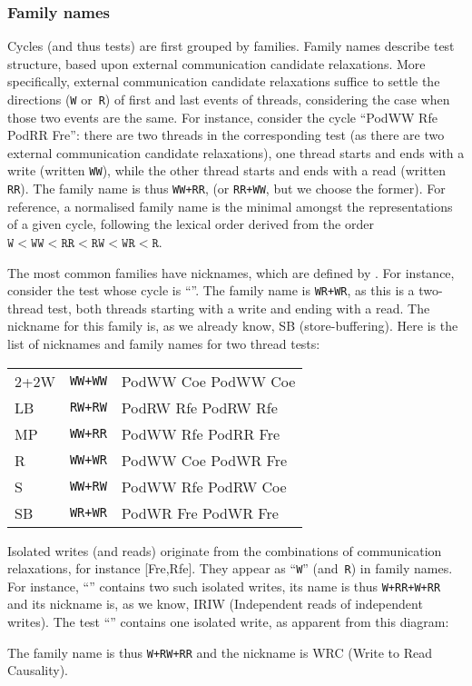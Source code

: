 \subsubsection{Family names}
Cycles (and thus tests) are first grouped by families.
Family names describe test structure,
based upon external communication candidate relaxations.
More specifically, external communication candidate relaxations
suffice to settle the directions (\texttt{W} or~\texttt{R}) of
first and last events of threads,
considering the case when those two events are the same.
For instance, consider the cycle ``PodWW Rfe PodRR Fre'':
there are two threads
in the corresponding test (as there are two external communication candidate
relaxations), one thread starts and ends with a write (written \texttt{WW}),
while the other thread starts and ends with a read (written \texttt{RR}).
The family name is thus
\texttt{WW+RR}, (or \texttt{RR+WW}, but we choose the former).
For reference, a normalised family name is the minimal
amongst the representations of a given cycle, following the lexical order
derived from the order
$\texttt{W} < \texttt{WW} <
\texttt{RR} < \texttt{RW} < \texttt{WR} < \texttt{R}$.

The most common families have nicknames, which are defined
by .
For instance, consider the test whose cycle is
``''.
The family name is \texttt{WR+WR}, as
this is a two-thread test, both threads starting with
a write and ending with a read.
The nickname for this family is, as we already know, SB (store-buffering).
Here is the list of nicknames and family names for two thread tests:
\begin{center}
\begin{tabular}{ll|l}
\hline
2+2W & \texttt{WW+WW} & PodWW Coe PodWW Coe \\
LB  & \texttt{RW+RW} & PodRW Rfe PodRW Rfe \\
MP & \texttt{WW+RR} & PodWW Rfe PodRR Fre \\
R & \texttt{WW+WR} & PodWW Coe PodWR Fre \\
S & \texttt{WW+RW} & PodWW Rfe PodRW Coe \\
SB & \texttt{WR+WR} & PodWR Fre PodWR Fre \\
\hline
\end{tabular}
\end{center}

Isolated writes (and reads) originate from the combinations of
communication relaxations,
for instance [Fre,Rfe].
They appear as ``\texttt{W}'' (and~\texttt{R}) in family names.
For instance,  ``''
contains two such isolated
writes, its name is thus \texttt{W+RR+W+RR} and its nickname is,
as we know, IRIW (Independent reads of independent writes).
The test ``''
contains one isolated write, as apparent from
this diagram:
\begin{center}\end{center}
The family name is thus \texttt{W+RW+RR} and the nickname is
WRC (Write to Read Causality).

